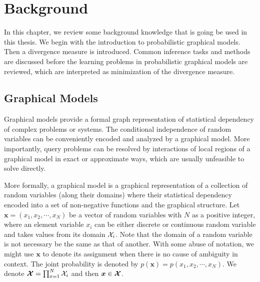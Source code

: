 \chapter{Background}
\label{chapter2}
In this chapter, we review some background knowledge that is going be used in this thesis. We begin with the introduction to probabilistic graphical models. Then a divergence measure is introduced. Common inference tasks and methods are discussed before the learning problems in probabilistic graphical models are reviewed, which are interpreted as minimization of the divergence measure.

\section{Graphical Models}
Graphical models provide a formal graph representation of statistical dependency of complex problems or systems. The conditional independence of random variables can be conveniently encoded and analyzed by a graphical model. More importantly, query problems can be resolved by interactions of local regions of a graphical model in exact or approximate ways, which are usually unfeasible to solve directly.

More formally, a graphical model is a graphical representation of a collection of random variables (along their domains) where their statistical dependency encoded into a set of non-negative functions and the graphical structure. Let $\bm{x}= (x_1, x_2, \cdots, x_N)$ be a vector of random variables with $N$ as a positive integer, where an element variable $x_i$ can be either discrete or continuous random variable and takes values from its domain $\mathcal{X}_i$. Note that the domain of a random variable is not necessary be the same as that of another. With some abuse of notation, we might use $\bm{x}$ to denote its assignment when there is no cause of ambiguity in context. The joint probability is denoted by $p(\bm{x})=p(x_1, x_2, \cdots, x_N)$.
We denote $\bm{\mathcal{X}} = \prod_{x=1}^{N} \mathcal{X}_i$ and then $\bm{x}\in \bm{\mathcal{X}}$.

